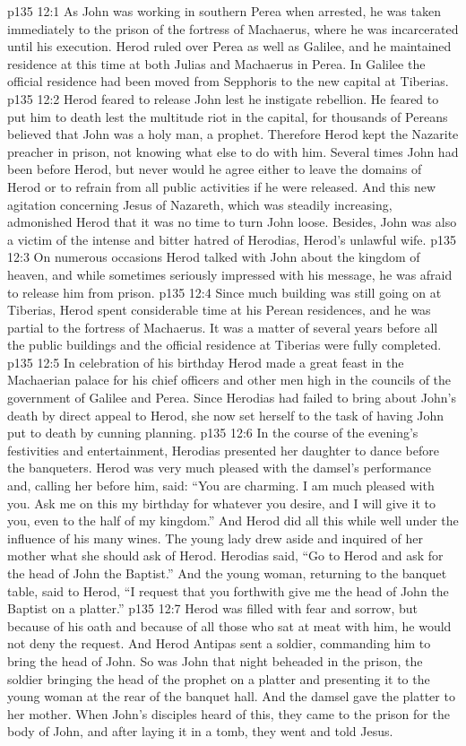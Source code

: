 \vs p135 12:1 As John was working in southern Perea when arrested, he was taken immediately to the prison of the fortress of Machaerus, where he was incarcerated until his execution. Herod ruled over Perea as well as Galilee, and he maintained residence at this time at both Julias and Machaerus in Perea. In Galilee the official residence had been moved from Sepphoris to the new capital at Tiberias.
\vs p135 12:2 Herod feared to release John lest he instigate rebellion. He feared to put him to death lest the multitude riot in the capital, for thousands of Pereans believed that John was a holy man, a prophet. Therefore Herod kept the Nazarite preacher in prison, not knowing what else to do with him. Several times John had been before Herod, but never would he agree either to leave the domains of Herod or to refrain from all public activities if he were released. And this new agitation concerning Jesus of Nazareth, which was steadily increasing, admonished Herod that it was no time to turn John loose. Besides, John was also a victim of the intense and bitter hatred of Herodias, Herod’s unlawful wife.
\vs p135 12:3 On numerous occasions Herod talked with John about the kingdom of heaven, and while sometimes seriously impressed with his message, he was afraid to release him from prison.
\vs p135 12:4 Since much building was still going on at Tiberias, Herod spent considerable time at his Perean residences, and he was partial to the fortress of Machaerus. It was a matter of several years before all the public buildings and the official residence at Tiberias were fully completed.
\pc \vs p135 12:5 In celebration of his birthday Herod made a great feast in the Machaerian palace for his chief officers and other men high in the councils of the government of Galilee and Perea. Since Herodias had failed to bring about John’s death by direct appeal to Herod, she now set herself to the task of having John put to death by cunning planning.
\vs p135 12:6 In the course of the evening’s festivities and entertainment, Herodias presented her daughter to dance before the banqueters. Herod was very much pleased with the damsel’s performance and, calling her before him, said: “You are charming. I am much pleased with you. Ask me on this my birthday for whatever you desire, and I will give it to you, even to the half of my kingdom.” And Herod did all this while well under the influence of his many wines. The young lady drew aside and inquired of her mother what she should ask of Herod. Herodias said, “Go to Herod and ask for the head of John the Baptist.” And the young woman, returning to the banquet table, said to Herod, “I request that you forthwith give me the head of John the Baptist on a platter.”
\vs p135 12:7 Herod was filled with fear and sorrow, but because of his oath and because of all those who sat at meat with him, he would not deny the request. And Herod Antipas sent a soldier, commanding him to bring the head of John. So was John that night beheaded in the prison, the soldier bringing the head of the prophet on a platter and presenting it to the young woman at the rear of the banquet hall. And the damsel gave the platter to her mother. When John’s disciples heard of this, they came to the prison for the body of John, and after laying it in a tomb, they went and told Jesus.
